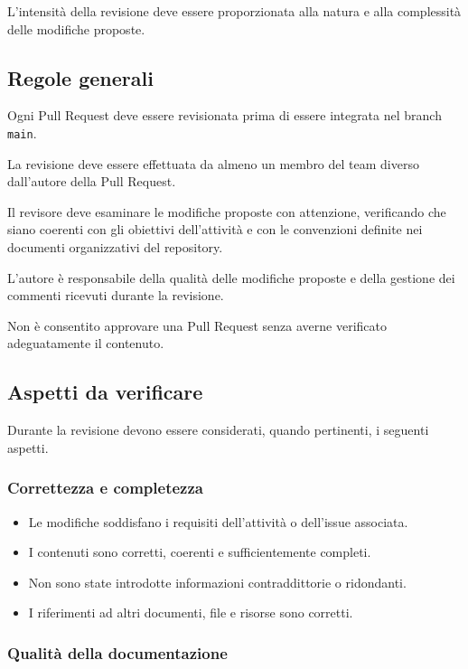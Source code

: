 \documentclass[11pt, a4paper]{article}
\begin{document}
\noindent L'intensità della revisione deve essere proporzionata alla natura e alla complessità delle modifiche proposte.

\subsection{Regole generali}
\label{subsec:regole-generali}

Ogni Pull Request deve essere revisionata prima di essere integrata nel branch \texttt{main}.

La revisione deve essere effettuata da almeno un membro del team diverso dall'autore della Pull Request.

Il revisore deve esaminare le modifiche proposte con attenzione, verificando che siano coerenti con gli obiettivi dell'attività e con le convenzioni definite nei documenti organizzativi del repository.

L'autore è responsabile della qualità delle modifiche proposte e della gestione dei commenti ricevuti durante la revisione.

Non è consentito approvare una Pull Request senza averne verificato adeguatamente il contenuto.

\subsection{Aspetti da verificare}

Durante la revisione devono essere considerati, quando pertinenti, i seguenti aspetti.

\subsubsection{Correttezza e completezza}

\begin{itemize}
    \item Le modifiche soddisfano i requisiti dell'attività o dell'issue associata.
    \item I contenuti sono corretti, coerenti e sufficientemente completi.
    \item Non sono state introdotte informazioni contraddittorie o ridondanti.
    \item I riferimenti ad altri documenti, file e risorse sono corretti.
\end{itemize}

\subsubsection{Qualità della documentazione}
\end{document}
